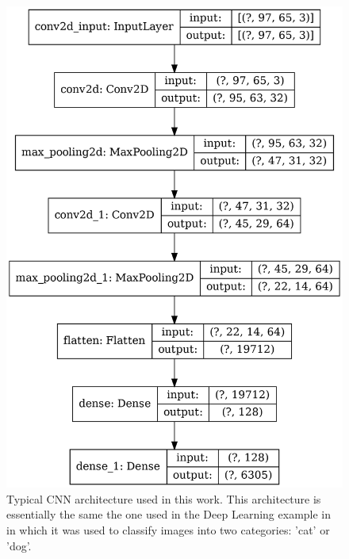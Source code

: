 \documentclass[12pt]{article}
\begin{document}
\begin{figure}[h] 
   \centering
    \includegraphics[totalheight=9cm]{Figures/typical_cnn.png}
    \caption{\label{fig:typical_cnn}Typical CNN architecture used in this work. This architecture is essentially the same the one used in the Deep Learning example in \cite{misc:udemy} in which it was used to classify images into two categories: 'cat' or 'dog'.}
\end{figure}
%
%
\end{document}
